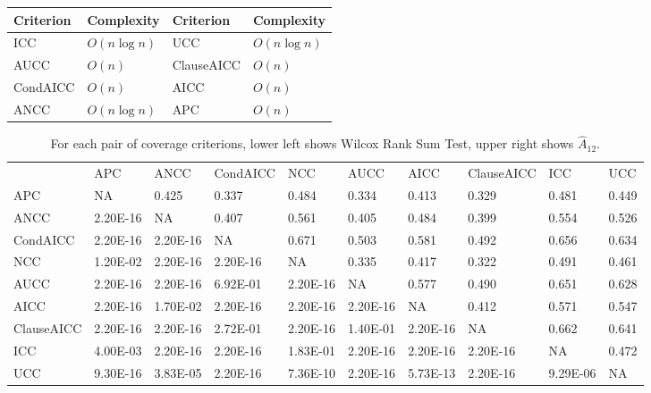 \begin{table}[h]
\begin{tabular}{ll|ll}
Criterion & Complexity & Criterion  & Complexity \\ \hline
ICC       & $O(n\log n)$ & UCC        & $O(n\log n)$ \\
AUCC      & $O(n)$       & ClauseAICC & $O(n)$       \\
CondAICC  & $O(n)$       & AICC       & $O(n)$       \\
ANCC      & $O(n\log n)$ & APC        & $O(n)$      
\end{tabular}
\end{table}

\begin{table}[h]
\begin{tabular}{llllllllll}
           & APC      & ANCC     & CondAICC & NCC      & AUCC     & AICC     & ClauseAICC & ICC      & UCC   \\ 
APC        & NA       & 0.425    & 0.337    & 0.484    & 0.334    & 0.413    & 0.329      & 0.481    & 0.449 \\
ANCC       & 2.20E-16 & NA       & 0.407    & 0.561    & 0.405    & 0.484    & 0.399      & 0.554    & 0.526 \\
CondAICC   & 2.20E-16 & 2.20E-16 & NA       & 0.671    & 0.503    & 0.581    & 0.492      & 0.656    & 0.634 \\
NCC        & 1.20E-02 & 2.20E-16 & 2.20E-16 & NA       & 0.335    & 0.417    & 0.322      & 0.491    & 0.461 \\
AUCC       & 2.20E-16 & 2.20E-16 & 6.92E-01 & 2.20E-16 & NA       & 0.577    & 0.490      & 0.651    & 0.628 \\
AICC       & 2.20E-16 & 1.70E-02 & 2.20E-16 & 2.20E-16 & 2.20E-16 & NA       & 0.412      & 0.571    & 0.547 \\
ClauseAICC & 2.20E-16 & 2.20E-16 & 2.72E-01 & 2.20E-16 & 1.40E-01 & 2.20E-16 & NA         & 0.662    & 0.641 \\
ICC        & 4.00E-03 & 2.20E-16 & 2.20E-16 & 1.83E-01 & 2.20E-16 & 2.20E-16 & 2.20E-16   & NA       & 0.472 \\
UCC        & 9.30E-16 & 3.83E-05 & 2.20E-16 & 7.36E-10 & 2.20E-16 & 5.73E-13 & 2.20E-16   & 9.29E-06 & NA    \\ 
\end{tabular}
\caption{For each pair of coverage criterions, lower left shows Wilcox
Rank Sum Test, upper right shows $\hat{A}_{12}$.}
\label{tab:crites}
\end{table}


